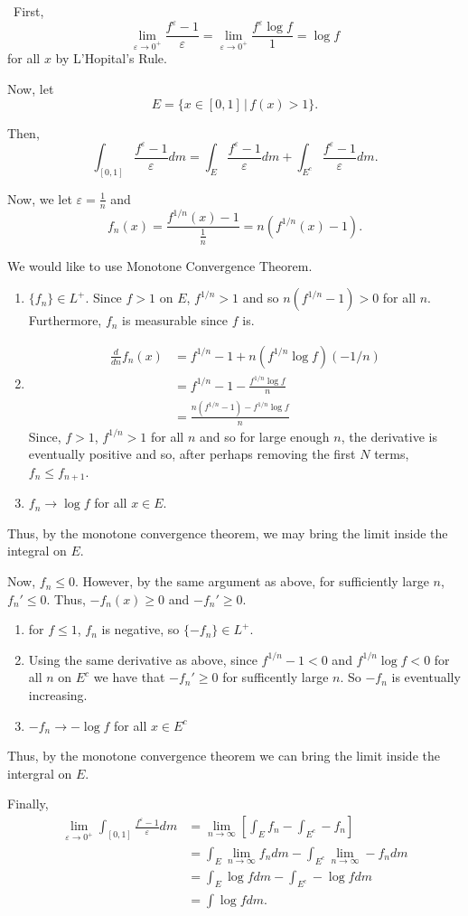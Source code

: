 \documentclass[12pt]{Qual}
\begin{document}
\begin{solution}$\,$
First, $$\lim_{\varepsilon\to0^+}\frac{f^\varepsilon-1}{\varepsilon}=\lim_{\varepsilon\to0^+}\frac{f^\varepsilon\log f}{1}=\log f$$ for all $x$ by L'Hopital's Rule.

Now, let $$E=\{x\in[0,1]\,|\,f(x)>1\}.$$

Then, $$\int_{[0,1]}\frac{f^\varepsilon-1}{\varepsilon}dm=\int_{E}\frac{f^\varepsilon-1}{\varepsilon}dm+\int_{E^c}\frac{f^\varepsilon-1}{\varepsilon}dm.$$

Now, we let $\varepsilon=\frac{1}{n}$ and $$f_n(x)=\frac{f^{1/n}(x)-1}{\frac{1}{n}}=n(f^{1/n}(x)-1).$$

 We would like to use Monotone Convergence Theorem.
\begin{enumerate}
    \item $\{f_n\}\in L^+$. Since $f>1$ on $E$, $f^{1/n}>1$ and so $n(f^{1/n}-1)>0$ for all $n$. Furthermore, $f_n$ is measurable since $f$ is.
    \item \begin{align*}
        \frac{d}{dn}f_n(x)&=f^{1/n}-1+n(f^{1/n}\log f)(-1/n)\\
        &=f^{1/n}-1-\frac{f^{1/n}\log f}{n}\\
        &=\frac{n(f^{1/n}-1)-f^{1/n}\log f}{n}
    \end{align*}
    Since, $f>1$, $f^{1/n}>1$ for all $n$ and so for large enough $n$, the derivative is eventually positive and so, after perhaps removing the first $N$ terms, $f_n\le f_{n+1}$.
    \item $f_n\to\log f$ for all $x\in E$.
\end{enumerate}

Thus, by the monotone convergence theorem, we may bring the limit inside the integral on $E$.

 Now, $f_n\le 0$. However, by the same argument as above, for sufficiently large $n$, $f_n'\le0$. Thus, $-f_n(x)\ge0$ and $-f_n'\ge 0$.
\begin{enumerate}
    \item for $f\le 1$, $f_n$ is negative, so $\{-f_n\}\in L^+$.
    \item Using the same derivative as above, since $f^{1/n}-1<0$ and $f^{1/n}\log f<0$ for all $n$ on $E^c$ we have that $-f_n'\ge0$ for sufficently large $n$. So $-f_n$ is eventually increasing.
    \item $-f_n\to -\log f$ for all $x\in E^c$
\end{enumerate}

Thus, by the monotone convergence theorem we can bring the limit inside the intergral on $E$.

Finally,
\begin{align*}
    \lim_{\varepsilon\to0^+}\int_{[0,1]}\frac{f^\varepsilon-1}{\varepsilon}dm&=\lim_{n\to\infty}\left[\int_Ef_n-\int_{E^c}-f_n\right]\\
    &=\int_E\lim_{n\to\infty}f_ndm-\int_{E^c}\lim_{n\to\infty}-f_ndm\\
    &=\int_E\log fdm-\int_{E^c}-\log fdm\\
    &=\int\log fdm.
\end{align*}

\end{solution}
\end{document}
